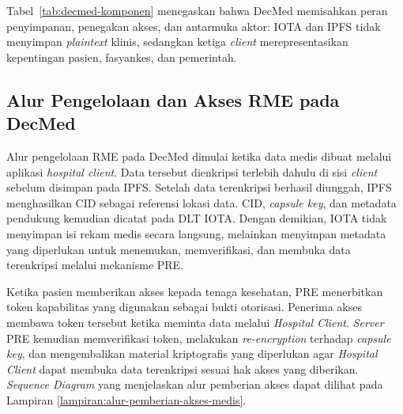 Tabel~\ref{tab:decmed-komponen} menegaskan bahwa DecMed memisahkan peran penyimpanan, penegakan akses, dan antarmuka aktor: IOTA dan IPFS tidak menyimpan \textit{plaintext} klinis, sedangkan ketiga \textit{client} merepresentasikan kepentingan pasien, fasyankes, dan pemerintah.

\subsection{Alur Pengelolaan dan Akses RME pada DecMed}

Alur pengelolaan RME pada DecMed dimulai ketika data medis dibuat melalui aplikasi \textit{hospital client}. Data tersebut dienkripsi terlebih dahulu di sisi \textit{client} sebelum disimpan pada IPFS. Setelah data terenkripsi berhasil diunggah, IPFS menghasilkan CID sebagai referensi lokasi data. CID, \textit{capsule key}, dan metadata pendukung kemudian dicatat pada DLT IOTA. Dengan demikian, IOTA tidak menyimpan isi rekam medis secara langsung, melainkan menyimpan metadata yang diperlukan untuk menemukan, memverifikasi, dan membuka data terenkripsi melalui mekanisme PRE.

Ketika pasien memberikan akses kepada tenaga kesehatan, PRE menerbitkan token kapabilitas yang digunakan sebagai bukti otorisasi. Penerima akses membawa token tersebut ketika meminta data melalui \textit{Hospital Client}. \textit{Server} PRE kemudian memverifikasi token, melakukan \textit{re-encryption} terhadap \textit{capsule key}, dan mengembalikan material kriptografis yang diperlukan agar \textit{Hospital Client} dapat membuka data terenkripsi sesuai hak akses yang diberikan. \textit{Sequence Diagram} yang menjelaskan alur pemberian akses dapat dilihat pada Lampiran \ref{lampiran:alur-pemberian-akses-medis}.
